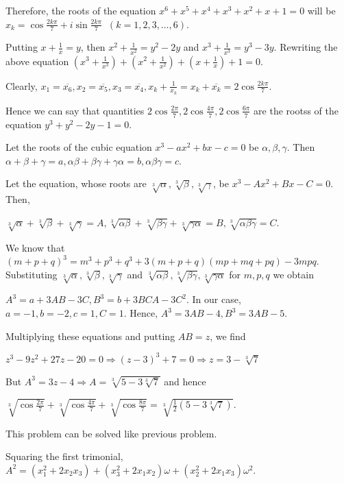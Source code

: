   Therefore, the roots of the equation $x^6 + x^5 + x^4 + x^3 + x^2 + x + 1 = 0$ will be $x_k =
  \cos\frac{2k\pi}{7} + i\sin\frac{2k\pi}{7}\;\;(k = 1, 2, 3, \ldots, 6)$.

  Putting $x + \frac{1}{x} = y$, then $x^2 + \frac{1}{x^2} = y^2 - 2y$ and $x^3 + \frac{1}{x^3} = y^3 -
  3y$. Rewriting the above equation $\left(x^3 + \frac{1}{x^3}\right) + \left(x^2 + \frac{1}{x^2}\right) +
  \left(x + \frac{1}{x}\right) + 1 = 0$.

  Clearly, $x_1 = \overline{x_6}, x_2 = \overline{x_5}, x_3 = \overline{x_4}, x_k + \frac{1}{x_k} = x_k +
  \overline{x_k} = 2\cos\frac{2k\pi}{7}$.

  Hence we can say that quantities $2\cos\frac{2\pi}{7},
  2\cos\frac{4\pi}{7}, 2\cos\frac{6\pi}{7}$ are the rootss of the equation $y^3 + y^2 - 2y - 1 = 0$.

  Let the roots of the cubic equation $x^3 - ax^2 + bx - c = 0$ be $\alpha, \beta, \gamma$. Then $\alpha +
  \beta + \gamma = a, \alpha\beta + \beta\gamma + \gamma\alpha = b, \alpha\beta\gamma = c$.

  Let the equation, whose roots are $\sqrt[3]{\alpha}, \sqrt[3]{\beta}, \sqrt[3]{\gamma}$, be $x^3 - Ax^2 +
  Bx - C = 0$. Then,

  $\sqrt[3]{\alpha} + \sqrt[3]{\beta} + \sqrt[3]{\gamma} = A, \sqrt[3]{\alpha\beta} + \sqrt[3]{\beta\gamma}
  + \sqrt[3]{\gamma\alpha} = B, \sqrt[3]{\alpha\beta\gamma} = C$.

  We know that $(m + p + q)^3 = m^3 + p^3 + q^3 + 3(m + p + q)(mp + mq + pq) - 3mpq$. Substituting
  $\sqrt[3]{\alpha}, \sqrt[3]{\beta}, \sqrt[3]{\gamma}$ and $\sqrt[3]{\alpha\beta}, \sqrt[3]{\beta\gamma},
  \sqrt[3]{\gamma\alpha}$ for $m, p, q$ we obtain

  $A^3 = a + 3AB - 3C, B^3 = b + 3BCA - 3C^2$. In our case, $a = -1, b = -2, c = 1, C = 1$. Hence, $A^3 = 3AB
  - 4, B^3 = 3AB - 5$.

  Multiplying these equations and putting $AB = z$, we find

  $z^3 - 9z^2 + 27z - 20 = 0 \Rightarrow (z - 3)^3 + 7 = 0 \Rightarrow z = 3 - \sqrt[3]{7}$

  But $A^3 = 3z - 4 \Rightarrow A = \sqrt[3]{5 - 3\sqrt[3]{7}}$ and hence

  $\sqrt[3]{\cos\frac{2\pi}{7}} + \sqrt[3]{\cos\frac{4\pi}{7}} + \sqrt[3]{\cos\frac{8\pi}{7}} =
  \sqrt[3]{\frac{1}{2}(5 - 3\sqrt[3]{7})}$.
\item This problem can be solved like previous problem.
\item Squaring the first trimonial, $A^2 = (x_1^2 + 2x_2x_3) + (x_3^2 + 2x_1x_2)\omega + (x_2^2 +
  2x_1x_3)\omega^2$.

